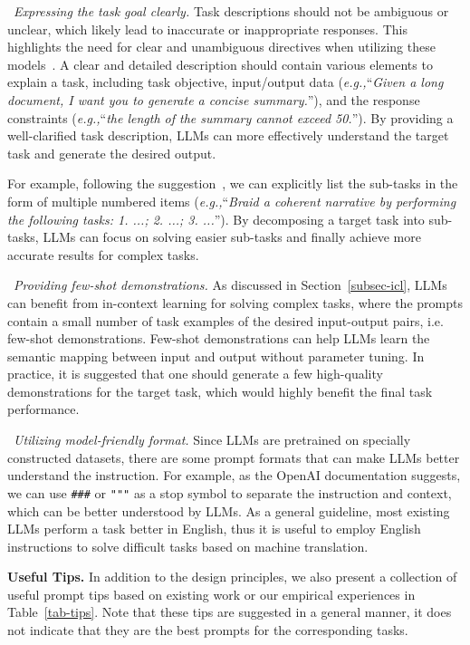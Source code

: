 {{{\textbullet~\emph{Expressing the task goal clearly.}  {Task descriptions should not be ambiguous or unclear, which likely lead to inaccurate or inappropriate responses.} This highlights the need for clear and unambiguous directives when utilizing these models~\cite{Ouyang-arxiv-2022-Training}. A clear and detailed description should contain various elements to explain a task, including task objective, input/output data (\emph{e.g.,}``\emph{Given a long document, I want you to generate a concise summary.}''),  and the response constraints (\emph{e.g.,}``\emph{the length of the summary cannot exceed 50.}''). By providing a well-clarified task description, LLMs can more effectively understand the target task and generate the desired output.

For example, following the suggestion~\cite{Santu-arxiv-2023-TELeR}, we can explicitly list the {sub-tasks in the form of multiple numbered items} (\emph{e.g.,}``\emph{Braid a coherent narrative by performing the following tasks: 1. ...; 2. ...; 3. ...}''). By decomposing a target task into sub-tasks, LLMs can focus on solving easier   sub-tasks and finally achieve more accurate results for complex tasks. 

\textbullet~\emph{Providing few-shot demonstrations.} As discussed in Section~\ref{subsec-icl},  LLMs can benefit from in-context learning for solving complex tasks, where the prompts contain a small number of task examples of the desired input-output pairs, i.e. few-shot demonstrations. Few-shot demonstrations can help LLMs learn the semantic mapping between input and output without parameter tuning. In practice, it is suggested that one should generate a few high-quality demonstrations for the target task, which would highly benefit the final task performance. 

\textbullet~\emph{Utilizing model-friendly format.} Since LLMs are pretrained on specially constructed datasets, there are some prompt formats that can make LLMs better understand the instruction. For example, as the OpenAI documentation suggests, we can use \texttt{\#\#\#} or \texttt{"""} as a stop symbol to separate the instruction and context, which can be better understood by LLMs. As a general guideline, most existing LLMs perform a task better in English, thus it is useful to employ English instructions to solve difficult tasks based on machine translation.

\textbf{Useful Tips.} In addition to the design principles, we also present a collection of  useful prompt tips based on existing work or our empirical experiences in Table~\ref{tab-tips}. 
Note that these tips are suggested in a general manner, it does not indicate that they are  the best prompts for the corresponding tasks.  

}}}
